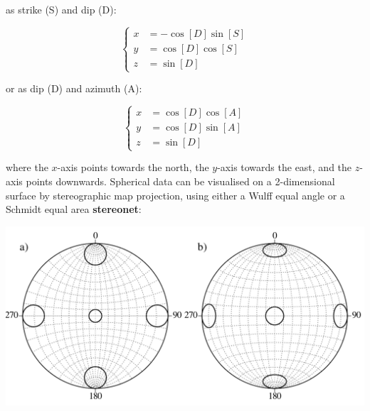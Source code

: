 \noindent as strike (S) and dip (D):

\begin{equation}
  \left\{
  \begin{split}
    x & = -\cos[D]\sin[S]\\
    y & = \cos[D]\cos[S]\\
    z & = \sin[D]
  \end{split}
  \right.
  \label{eq:SD}
\end{equation}

\noindent or as dip (D) and azimuth (A):

\begin{equation}
  \left\{
  \begin{split}
    x & = \cos[D] \cos[A]\\
    y & = \cos[D] \sin[A]\\
    z & = \sin[D]
  \end{split}
  \right.
  \label{eq:AD}
\end{equation}

\noindent where the $x$-axis points towards the north, the $y$-axis
towards the east, and the $z$-axis points downwards.  Spherical data
can be visualised on a 2-dimensional surface by stereographic map
projection, using either a Wulff equal angle or a Schmidt equal area
\textbf{stereonet}:

\noindent\begin{minipage}[t][][b]{.6\textwidth}
\includegraphics[width=\textwidth]{../figures/wulffschmidt.pdf}\\
\end{minipage}
\begin{minipage}[t][][t]{.4\textwidth}
  \label{fig:wulffschmidt}
\end{minipage}

